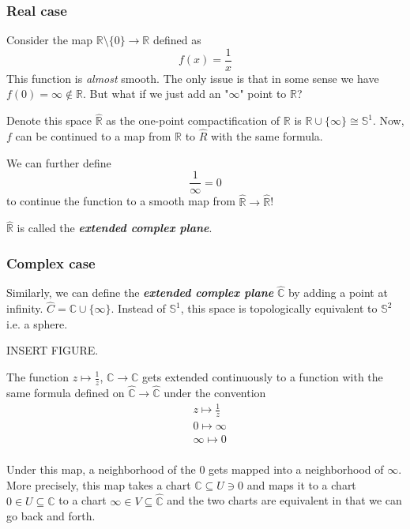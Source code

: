 \documentclass[11pt]{article}
\newcommand{\R}{\mathbb{R}}
\newcommand{\C}{\mathbb{C}}
\newcommand{\bS}{\mathbb{S}}
\begin{document}
\subsubsection*{Real case}
\begin{redbox}
    Consider the map  $\R \setminus \{0\} \rightarrow \R$ defined as 
    \[ f(x) = \frac{1}{x} \]
    This function is \emph{almost} smooth. The only issue is that in some sense we have $f(0) = \infty \not\in \R$. But what if we just add an "$\infty$" point to $\R$?

    \vskip 0.5cm
    Denote this space $\hat{\R}$ as the one-point compactification of $\R$ is $\R \cup \{\infty\} \cong \mathbb{S}^1$. Now, $f$ can be continued to a map from $\R$ to $\hat{R}$ with the same formula.

    \vskip 0.5cm
    We can further define 
    \[ \frac{1}{\infty} = 0 \] to continue the function to a smooth map from $\hat{\R} \rightarrow \hat{\R}$!

    \vskip 0.5cm
    $\hat{\R}$ is called the \emph{\textbf{extended complex plane}}.
\end{redbox}

\vskip 0.5cm
\subsubsection*{Complex case}

Similarly, we can define the \emph{\textbf{extended complex plane}} $\hat{\C}$ by adding a point at infinity. $\hat{C} = \C \cup \{\infty\}$. Instead of $\bS^1$, this space is topologically equivalent to $\bS^2$ i.e. a sphere.

\vskip 0.5cm
INSERT FIGURE.

\vskip 0.5cm
The function $z \mapsto \frac{1}{z}$, $\C \rightarrow \C$ gets extended continuously to a function with the same formula defined on $\hat{\C} \rightarrow \hat{\C}$ under the convention 
\begin{align*}
    &z \mapsto \frac{1}{z} \\
    &0 \mapsto \infty \\
    &\infty \mapsto 0\\
\end{align*}

\vskip 0.25cm
Under this map, a neighborhood of the $0$ gets mapped into a neighborhood of $\infty$. More precisely, this map takes a chart $\C \subseteq U \ni 0$ and maps it to a chart $0 \in U \subseteq \C$ to a chart $\infty \in V \subseteq \hat{\C}$ and the two charts are equivalent in that we can go back and forth.
\end{document}
